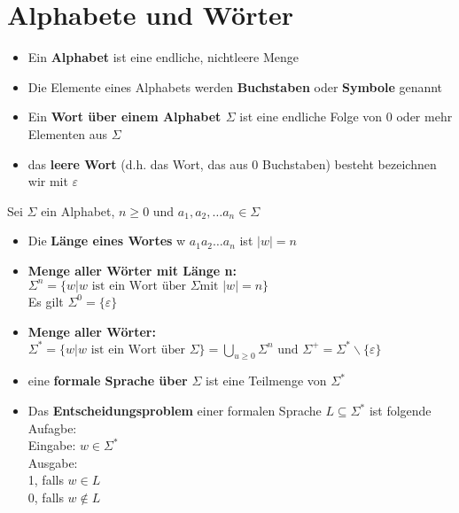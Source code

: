 \documentclass[14pt]{article}
\begin{document}
\section{Alphabete und Wörter}
\begin{definition}
    \begin{itemize}
        \item Ein \textbf{Alphabet} ist eine endliche, nichtleere Menge
        \item Die Elemente eines Alphabets werden \textbf{Buchstaben}
              oder \textbf{Symbole} genannt
        \item Ein \textbf{Wort über einem Alphabet $\varSigma$} ist eine
              endliche Folge von 0 oder mehr Elementen aus $\varSigma$
        \item das \textbf{leere Wort} (d.h. das Wort, das aus 0 Buchstaben)
              besteht bezeichnen wir mit $\varepsilon$
    \end{itemize}
\end{definition}
\begin{definition}
    Sei $\varSigma$ ein Alphabet, $n \geq 0$ und $a_1, a_2, \dots a_n
        \in \varSigma$
    \begin{itemize}
        \item Die \textbf{Länge eines Wortes} w $a_1a_2\dots a_n$ ist
              $|w| = n$
        \item \textbf{Menge aller Wörter mit Länge n:} \\
              $\varSigma^n = \{ w | w \text{ ist ein Wort über $\varSigma$
                      mit $|w| = n$} \}$ \\
              Es gilt $\varSigma^0 = \{ \varepsilon \}$
        \item \textbf{Menge aller Wörter:} \\
              $\varSigma^* = \{ w | w \text{ ist ein Wort über $\varSigma$}\}
                  = \bigcup_{u\geq 0} \varSigma^n \text{ und } \varSigma^+
                  = \varSigma^* \backslash \{ \varepsilon \} $
        \item eine \textbf{formale Sprache über} $\varSigma$ ist
              eine Teilmenge von $\varSigma^*$
        \item Das \textbf{Entscheidungsproblem} einer formalen Sprache
              $L \subseteq \varSigma^*$ ist folgende Aufagbe: \\
              Eingabe: $w \in \varSigma^*$ \\
              Ausgabe: \\
              1, falls $w \in L$ \\
              0, falls $w \notin L$
    \end{itemize}
\end{definition}
\end{document}
